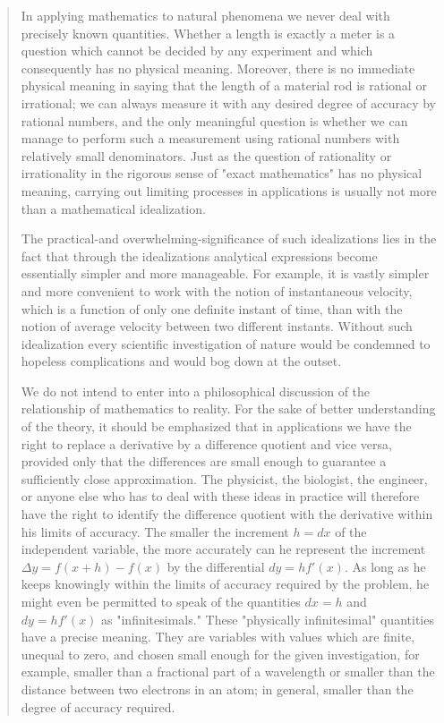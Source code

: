\documentclass[11pt,a4paper]{article}
\begin{document}
\begin{quote}
	In applying mathematics to natural phenomena we never deal with
	precisely known quantities. Whether a length is exactly a meter is a
	question which cannot be decided by any experiment and which consequently has no physical meaning. Moreover, there is no immediate
	physical meaning in saying that the length of a material rod is rational
	or irrational; we can always measure it with any desired degree of accuracy by rational numbers, and the only meaningful question is
	whether we can manage to perform such a measurement using rational
	numbers with relatively small denominators. Just as the question of
	rationality or irrationality in the rigorous sense of "exact mathematics"
	has no physical meaning, carrying out limiting processes in applications
	is usually not more than a mathematical idealization. 
	
	The practical-and overwhelming-significance of such idealizations
	lies in the fact that through the idealizations analytical expressions
	become essentially simpler and more manageable. For example, it is
	vastly simpler and more convenient to work with the notion of instantaneous velocity, which is a function of only one definite instant of
	time, than with the notion of average velocity between two different
	instants. Without such idealization every scientific investigation of
	nature would be condemned to hopeless complications and would
	bog down at the outset. 
	
	We do not intend to enter into a philosophical discussion of the
	relationship of mathematics to reality. For the sake of better understanding of the theory, it should be emphasized that in applications we
	have the right to replace a derivative by a difference quotient and vice
	versa, provided only that the differences are small enough to guarantee
	a sufficiently close approximation. The physicist, the biologist, the
	engineer, or anyone else who has to deal with these ideas in practice will
	therefore have the right to identify the difference quotient with the
	derivative within his limits of accuracy. The smaller the increment
	$h = dx$ of the independent variable, the more accurately can he represent the increment $\Delta y = f(x + h) - f(x)$ by the differential $dy = hf'(x)$. As long as he keeps knowingly within the limits of accuracy required by the problem, he might even be permitted to speak of the
	quantities $dx = h$ and $dy = hf'(x)$ as "infinitesimals." These "physically infinitesimal" quantities have a precise meaning. They are variables with values which are finite, unequal to zero, and chosen small enough for the given investigation, for example, smaller than a fractional part of a wavelength or smaller than the distance between two electrons in an atom; in general, smaller than the degree of accuracy required. 
\end{quote}
\end{document}
